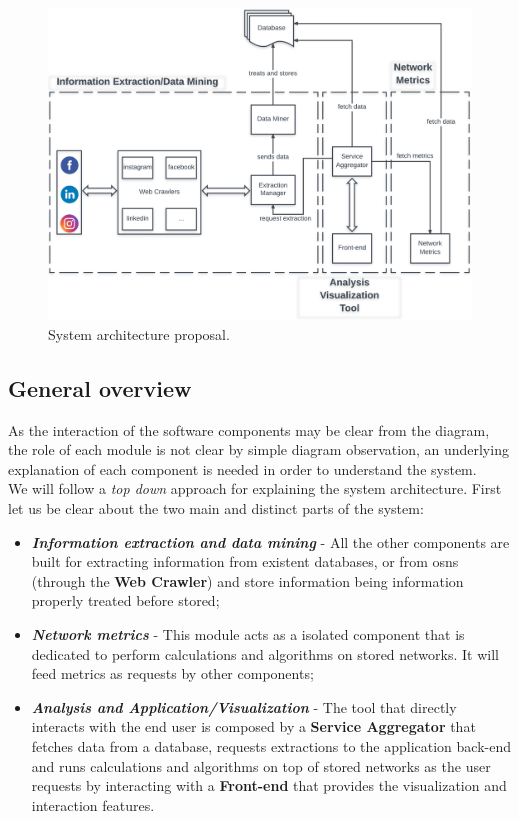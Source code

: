 \begin{figure}[h!]
\begin{center}
  \hspace*{-0.8in}
  \includegraphics[width=1.2\textwidth]{img/architecture.png}
\end{center}
\caption{\label{img:architectureprop} System architecture proposal.}
\end{figure}

\subsection{General overview}
As the interaction of the software components may be clear from the diagram, the role of each module is not clear by simple
diagram observation, an underlying explanation of each component is needed in order to understand the system.\\
\indent We will follow a \textit{top down} approach for explaining the system architecture. First let us be clear about the two
main and distinct parts of the system:
\begin{itemize}
    \item \textbf{\textit{Information extraction and data mining}} - All the other components are built for extracting information
    from existent databases, or from \glspl{osn} (through the \textbf{Web Crawler}) and store information being information properly treated before stored;
    \item \textbf{\textit{Network metrics}} - This module acts as a isolated component that is dedicated to perform calculations and algorithms on stored networks. It will feed metrics as requests by other components;
    \item \textbf{\textit{Analysis and Application/Visualization}} - The tool that directly interacts with the end user is composed by a \textbf{Service Aggregator} that fetches data from a database, requests extractions to the application back-end and runs calculations and algorithms on top of stored networks as the user requests by interacting with a \textbf{Front-end} that provides the visualization and interaction features.
\end{itemize}


